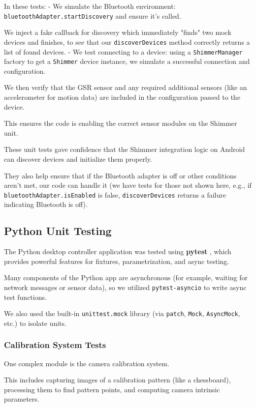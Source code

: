 {{{In these tests: - We simulate the Bluetooth environment: \texttt{bluetoothAdapter.startDiscovery} and ensure it's called.

We inject a fake callback for discovery which immediately "finds" two mock devices and finishes, to see that our \texttt{discoverDevices} method correctly returns a list of found devices. - We test connecting to a device: using a \texttt{ShimmerManager} factory to get a \texttt{Shimmer} device instance, we simulate a successful connection and configuration.

We then verify that the GSR sensor and any required additional sensors (like an accelerometer for motion data) are included in the configuration passed to the device.

This ensures the code is enabling the correct sensor modules on the Shimmer unit.

These unit tests gave confidence that the Shimmer integration logic on Android can discover devices and initialize them properly.

They also help ensure that if the Bluetooth adapter is off or other conditions aren't met, our code can handle it (we have tests for those not shown here, e.g., if \texttt{bluetoothAdapter.isEnabled} is false, \texttt{discoverDevices} returns a failure indicating Bluetooth is off).

\subsection{Python Unit Testing}

The Python desktop controller application was tested using \textbf{pytest}
, which provides powerful features for fixtures, parametrization, and async testing.

Many components of the Python app are asynchronous (for example, waiting for network messages or sensor data), so we utilized \texttt{pytest-asyncio} to write async test functions.

We also used the built-in \texttt{unittest.mock} library (via \texttt{patch}, \texttt{Mock}, \texttt{AsyncMock}, etc.) to isolate units.

\subsubsection{Calibration System Tests}

One complex module is the camera calibration system.

This includes capturing images of a calibration pattern (like a chessboard), processing them to find pattern points, and computing camera intrinsic parameters.

}}}
